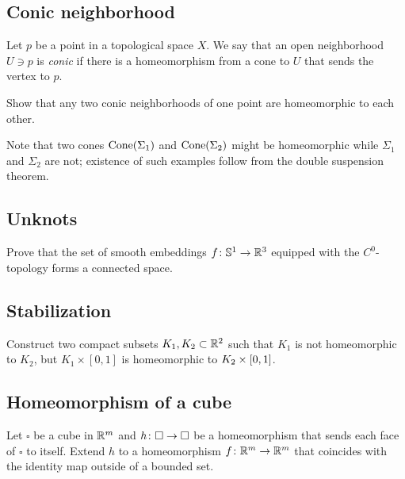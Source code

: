 \subsection*{Conic neighborhood}
\label{Conic neighborhood}

Let $p$ be a point in a topological space $X$.
We say that an open neighborhood $U\ni p$ is \emph{conic}
if there is a homeomorphism from a cone
to $U$ that sends the vertex to $p$.

\begin{pr}  
Show that any two conic neighborhoods of one point are homeomorphic to each other.
\end{pr}

Note that two cones $\mathop{\rm Cone}(\Sigma_1)$ and $\mathop{\rm Cone}(\Sigma_2)$ might be homeomorphic while $\Sigma_1$ and $\Sigma_2$ are not;
existence of such examples follow from the double suspension theorem.

\subsection*{Unknots\easy}\label{No knots}

\begin{pr}
Prove that the set of smooth embeddings $f\:\mathbb{S}^1\z\to\RR^3$ equipped with the $C^0$-topology 
forms a connected space.
\end{pr}

\subsection*{Stabilization}\label{Simple stabilization}

\begin{pr}
Construct two compact subsets $K_1, K_2\subset\mathbb{R}^2$ such that
$K_1$ is not homeomorphic to $K_2$, but $K_1\times[0,1]$ is homeomorphic to $K_2\z\times[0,1]$.
\end{pr}

\subsection*{Homeomorphism of a cube}\label{Homeomorphism of cube}

\begin{pr}
Let $\square$ be a cube in $\mathbb{R}^m$
and $h\:\square\z\to\square$ be
a homeomorphism that sends each face of $\square$ to itself.
Extend $h$ to a homeomorphism $f\:\RR^m\z\to\RR^m$ that coincides with the identity map outside of a bounded set.    
\end{pr}

